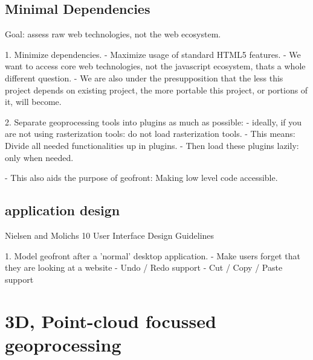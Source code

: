 


\subsection{Minimal Dependencies}

Goal: assess raw web technologies, not the web ecosystem. 

1. Minimize dependencies. 
  - Maximize usage of standard HTML5 features.
  - We want to access core web technologies, not the javascript ecosystem, thats a whole different question. 
  - We are also under the presupposition that the less this project depends on existing project, the more portable this project, or portions of it, will become.

2. Separate geoprocessing tools into plugins as much as possible: 
  - ideally, if you are not using rasterization tools: do not load rasterization tools. 
  - This means: Divide all needed functionalities up in plugins.
     - Then load these plugins lazily: only when needed.

  - This also aids the purpose of geofront: Making low level code accessible.

\subsection{application design}

Nielsen and Molichs 10 User Interface Design Guidelines

1. Model geofront after a 'normal' desktop application. 
  - Make users forget that they are looking at a website
  - Undo / Redo support
  - Cut / Copy / Paste support



\section{3D, Point-cloud focussed geoprocessing}

